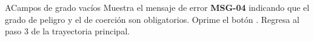 \begin{UCtrayectoriaA}{A}{Campos de grado vacíos}
	\UCpaso Muestra el mensaje de error \textbf{MSG-04} indicando que el grado de peligro y el de coerción son obligatorios.
	\UCpaso[\UCactor] Oprime el botón .
	\UCpaso Regresa al paso 3 de la trayectoria principal.
\end{UCtrayectoriaA}

